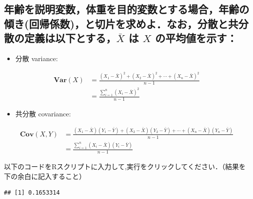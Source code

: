 \documentclass[]{problemset}
\newenvironment{Shaded}{\begin{snugshade}}{\end{snugshade}}
\newcommand{\CommentTok}[1]{\textcolor[rgb]{0.56,0.35,0.01}{\textit{#1}}}
\newcommand{\KeywordTok}[1]{\textcolor[rgb]{0.13,0.29,0.53}{\textbf{#1}}}
\newcommand{\NormalTok}[1]{#1}
\newcommand{\OperatorTok}[1]{\textcolor[rgb]{0.81,0.36,0.00}{\textbf{#1}}}
\newcommand{\StringTok}[1]{\textcolor[rgb]{0.31,0.60,0.02}{#1}}
\providecommand{\tightlist}{%
  \setlength{\itemsep}{0pt}\setlength{\parskip}{0pt}}
\begin{document}
\hypertarget{barx--x-}{%
\subsection{\texorpdfstring{年齢を説明変数，体重を目的変数とする場合，年齢の傾き(回帰係数)，と切片を求めよ．なお，分散と共分散の定義は以下とする，\(\bar{X}\)
は \(X\)
の平均値を示す：}{年齢を説明変数，体重を目的変数とする場合，年齢の傾き(回帰係数)，と切片を求めよ．なお，分散と共分散の定義は以下とする，\textbackslash{}bar\{X\} は X の平均値を示す：}}\label{barx--x-}}

\begin{itemize}
\tightlist
\item
  分散 variance:
\end{itemize}

\[
\begin{aligned}
\mathbf{Var}(X) & = \frac{(X_1-\bar{X})^2+(X_2-\bar{X})^2+\cdots+(X_n-\bar{X})^2}{n - 1} \\
                & = \frac{\sum_{i=1}^n(X_i-\bar{X})^2}{n -1}
\end{aligned}
\]

\begin{itemize}
\tightlist
\item
  共分散 covariance:
\end{itemize}

\[
\begin{aligned}
\mathbf{Cov}(X, Y) & = \frac{(X_1 - \bar{X})(Y_1-\bar{Y}) + (X_2 - \bar{X})(Y_2-\bar{Y}) + \cdots + (X_n - \bar{X})(Y_n-\bar{Y})}{n - 1} \\
                   & = \frac{\sum_{i = 1}^n(X_i - \bar{X})(Y_i-\bar{Y})}{n - 1}
\end{aligned}
\]

以下のコードをRスクリプトに入力して,実行をクリックしてください．（結果を下の余白に記入すること）

\begin{Shaded}
\end{Shaded}

\begin{verbatim}
## [1] 0.1653314
\end{verbatim}
\end{document}
